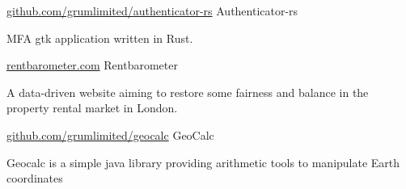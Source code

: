 

\begin{cventries}

  \cventry
    {\href{https://github.com/grumlimited/authenticator-rs}{github.com/grumlimited/authenticator-rs}} %
     {\hspace{0.2em}Authenticator-rs} %
    {} %
    {} %
    {}
    {
      \begin{cvitems} %
        \item {MFA gtk application written in Rust.}
      \end{cvitems}
    }


  \cventry
    {\href{https://www.rentbarometer.com}{rentbarometer.com}} %
    {\hspace{0.5em}Rentbarometer} %
    {} %
    {} %
    {}
    {
      \begin{cvitems} %
        \item {A data-driven website aiming to restore some fairness and balance in the property rental market in London.}
      \end{cvitems}
    }
  \cventry
    {\href{https://github.com/grumlimited/geocalc}{github.com/grumlimited/geocalc}} %
    {\hspace{0.2em}GeoCalc} %
    {} %
    {} %
    {}
    {
      \begin{cvitems} %
        \item {Geocalc is a simple java library providing arithmetic tools to manipulate Earth coordinates}
      \end{cvitems}
    }
\end{cventries}
